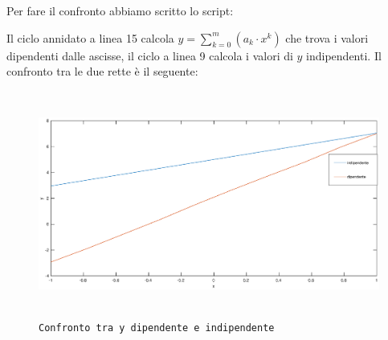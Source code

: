 \begin{flushleft}
Per fare il confronto abbiamo scritto lo script:

Il ciclo annidato a linea 15 calcola $y = \sum_{k=0}^{m} (a_k\cdot x^k)$ che trova i valori dipendenti dalle ascisse, il ciclo a linea 9 calcola i valori di $y$ indipendenti. Il confronto tra le due rette è il seguente:
\begin{figure}[H]
\includegraphics[width=480px, height=280px]{plot/fes410}
\caption{\texttt{Confronto tra y dipendente e indipendente}}
\end{figure}
\end{flushleft}